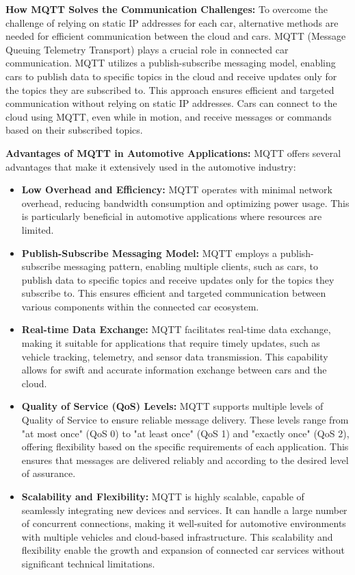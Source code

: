 \documentclass[
12pt,
oneside, 
onehalfspacing, 
nolistspacing, 
parskip, 
chapterinoneline, 
]{AASTCOMPUTER}
\begin{document}
\textbf{How MQTT Solves the Communication Challenges:}
To overcome the challenge of relying on static IP addresses for each car, alternative methods are needed for efficient communication between the cloud and cars. MQTT (Message Queuing Telemetry Transport) plays a crucial role in connected car communication. MQTT utilizes a publish-subscribe messaging model, enabling cars to publish data to specific topics in the cloud and receive updates only for the topics they are subscribed to. This approach ensures efficient and targeted communication without relying on static IP addresses. Cars can connect to the cloud using MQTT, even while in motion, and receive messages or commands based on their subscribed topics.

\textbf{Advantages of MQTT in Automotive Applications:}
MQTT offers several advantages that make it extensively used in the automotive industry:

\begin{itemize}
  \item \textbf{Low Overhead and Efficiency:} MQTT operates with minimal network overhead, reducing bandwidth consumption and optimizing power usage. This is particularly beneficial in automotive applications where resources are limited.
  \item \textbf{Publish-Subscribe Messaging Model:} MQTT employs a publish-subscribe messaging pattern, enabling multiple clients, such as cars, to publish data to specific topics and receive updates only for the topics they subscribe to. This ensures efficient and targeted communication between various components within the connected car ecosystem.
  \item \textbf{Real-time Data Exchange:} MQTT facilitates real-time data exchange, making it suitable for applications that require timely updates, such as vehicle tracking, telemetry, and sensor data transmission. This capability allows for swift and accurate information exchange between cars and the cloud.
  \item \textbf{Quality of Service (QoS) Levels:} MQTT supports multiple levels of Quality of Service to ensure reliable message delivery. These levels range from "at most once" (QoS 0) to "at least once" (QoS 1) and "exactly once" (QoS 2), offering flexibility based on the specific requirements of each application. This ensures that messages are delivered reliably and according to the desired level of assurance.
  \item \textbf{Scalability and Flexibility:} MQTT is highly scalable, capable of seamlessly integrating new devices and services. It can handle a large number of concurrent connections, making it well-suited for automotive environments with multiple vehicles and cloud-based infrastructure. This scalability and flexibility enable the growth and expansion of connected car services without significant technical limitations.
\end{itemize}
\end{document}
